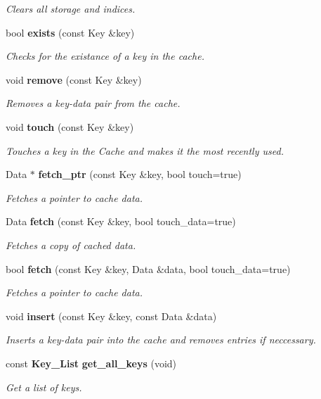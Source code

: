 \begin{DoxyCompactItemize}
\begin{DoxyCompactList}\small\item\em Clears all storage and indices. \item\end{DoxyCompactList}\item 
bool {\bf exists} (const Key \&key)
\begin{DoxyCompactList}\small\item\em Checks for the existance of a key in the cache. \item\end{DoxyCompactList}\item 
void {\bf remove} (const Key \&key)
\begin{DoxyCompactList}\small\item\em Removes a key-\/data pair from the cache. \item\end{DoxyCompactList}\item 
void {\bf touch} (const Key \&key)
\begin{DoxyCompactList}\small\item\em Touches a key in the Cache and makes it the most recently used. \item\end{DoxyCompactList}\item 
Data $\ast$ {\bf fetch\_\-ptr} (const Key \&key, bool touch=true)
\begin{DoxyCompactList}\small\item\em Fetches a pointer to cache data. \item\end{DoxyCompactList}\item 
Data {\bf fetch} (const Key \&key, bool touch\_\-data=true)
\begin{DoxyCompactList}\small\item\em Fetches a copy of cached data. \item\end{DoxyCompactList}\item 
bool {\bf fetch} (const Key \&key, Data \&data, bool touch\_\-data=true)
\begin{DoxyCompactList}\small\item\em Fetches a pointer to cache data. \item\end{DoxyCompactList}\item 
void {\bf insert} (const Key \&key, const Data \&data)
\begin{DoxyCompactList}\small\item\em Inserts a key-\/data pair into the cache and removes entries if neccessary. \item\end{DoxyCompactList}\item 
const {\bf Key\_\-List} {\bf get\_\-all\_\-keys} (void)
\begin{DoxyCompactList}\small\item\em Get a list of keys. \item\end{DoxyCompactList}\end{DoxyCompactItemize}



